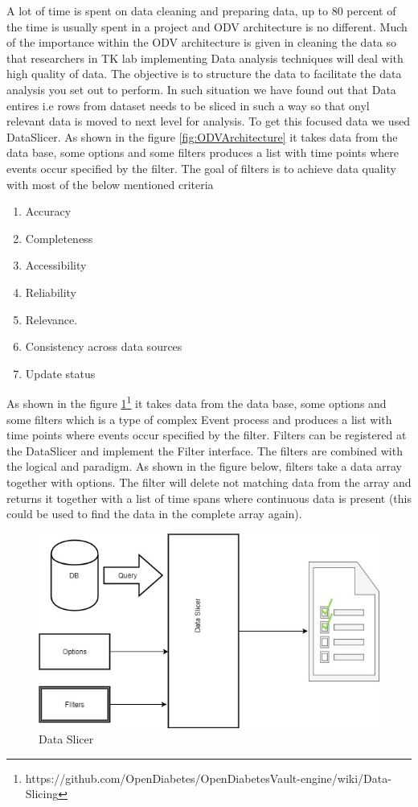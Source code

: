 \documentclass[article,type=msc,colorback,accentcolor=tud9c,twoside,11pt]{tudthesis}
\begin{document}
A lot of time is spent on data cleaning and preparing data, up to 80 percent \cite{TinyData} of the time is usually spent in a project and ODV architecture is no different. Much of the importance within the ODV architecture is given in cleaning the data so that researchers in TK lab implementing Data analysis techniques will deal with high quality of data. The objective is to structure the data to facilitate the data analysis you set out to perform. In such situation we have found out that Data entires i.e rows from dataset needs to be sliced in such a way so that onyl relevant data is moved to next level for analysis. To get this focused data we used DataSlicer. As shown in the figure \ref{fig:ODVArchitecture} it takes data from the data base, some options and some filters produces a list with time points where events occur specified by the filter. The goal of filters is to achieve data quality with most of the below mentioned criteria
\begin{enumerate}
	\item Accuracy
	\item Completeness
	\item Accessibility
	\item Reliability
	\item Relevance.
	\item Consistency across data sources
	\item Update status
\end{enumerate}
As shown in the figure \ref{fig:Dataslicer}\footnote{https://github.com/OpenDiabetes/OpenDiabetesVault-engine/wiki/Data-Slicing} it takes data from the data base, some options and some filters which is a type of complex Event process \cite{EventProcessing} and produces a list with time points where events occur specified by the filter. Filters can be registered at the DataSlicer and implement the Filter interface. The filters are combined with the logical and paradigm. As shown in the figure below, filters take a data array together with options. The filter will delete not matching data from the array and returns it together with a list of time spans where continuous data is present (this could be used to find the data in the complete array again). 
\begin{figure}[h]
	\centering
	\includegraphics[scale=0.7]{Dataslicer.jpg}
	\caption{Data Slicer}
	\label{fig:Dataslicer}
\end{figure}
\end{document}
